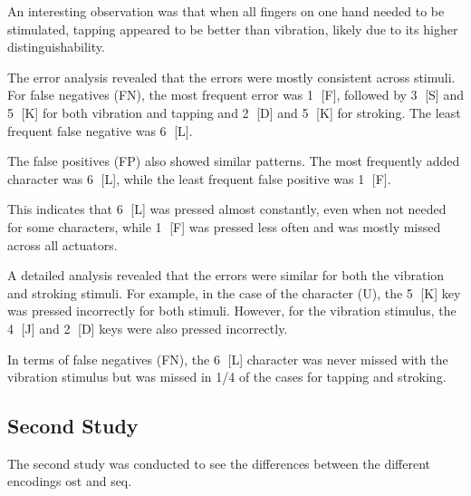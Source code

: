An interesting observation was that when all fingers on one hand needed to be stimulated, tapping appeared to be better than vibration, likely due to its higher distinguishability.





The error analysis revealed that the errors were mostly consistent across stimuli. For false negatives (FN), the most frequent error was \textcircled{1} [F], followed by \textcircled{3} [S] and \textcircled{5} [K] for both vibration and tapping and \textcircled{2} [D] and \textcircled{5} [K] for stroking. The least frequent false negative was \textcircled{6} [L].

The false positives (FP) also showed similar patterns. The most frequently added character was \textcircled{6} [L], while the least frequent false positive was \textcircled{1} [F].

This indicates that \textcircled{6} [L] was pressed almost constantly, even when not needed for some characters, while \textcircled{1} [F] was pressed less often and was mostly missed across all actuators.

A detailed analysis revealed that the errors were similar for both the vibration and stroking stimuli. For example, in the case of the character (U), the \textcircled{5} [K] key was pressed incorrectly for both stimuli. However, for the vibration stimulus, the \textcircled{4} [J] and \textcircled{2} [D] keys were also pressed incorrectly.

In terms of false negatives (FN), the \textcircled{6} [L] character was never missed with the vibration stimulus but was missed in 1/4 of the cases for tapping and stroking.

\subsection{Second Study}
The second study was conducted to see the differences between the different encodings \gls{ost} and \gls{seq}.

